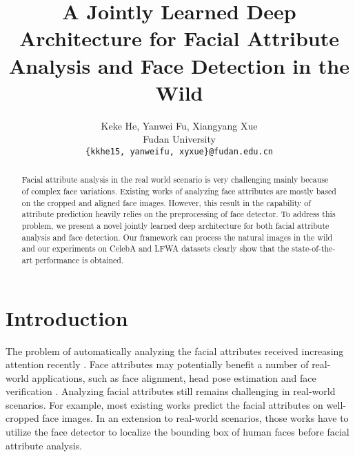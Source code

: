 \documentclass[10pt,twocolumn,letterpaper]{article}
\begin{document}
\title{A Jointly Learned Deep Architecture for Facial Attribute Analysis and Face Detection in the Wild}

\author{Keke He, Yanwei Fu, Xiangyang Xue\\
Fudan University \\
{\tt\small \{kkhe15, yanweifu, xyxue\}@fudan.edu.cn}
}

\maketitle



\begin{abstract}
Facial attribute analysis in the real world scenario is very challenging mainly because of complex face variations. Existing works of analyzing face attributes are mostly based on the cropped and aligned face images. However, this result in the capability of attribute prediction heavily relies on the preprocessing of face detector. To address this problem, we present a novel jointly learned deep architecture for both facial attribute analysis and face detection. Our framework can process the natural images in the wild and our experiments on CelebA and LFWA datasets clearly show that the state-of-the-art performance is obtained. 
\end{abstract}


\section{Introduction}
The problem of automatically analyzing the facial attributes received increasing attention recently
\cite{rudd2016moon,liu2015deep,off_shelf_face}.
Face attributes may potentially benefit a number of real-world applications,
such as face alignment\cite{ren2014face,sagonas2013300,zhang2014facial,zhou2013extensive},
head pose estimation \cite{zhu2012face,yang2015face} and face verification
\cite{taigman2014deepface,sun2014deep}. Analyzing facial attributes
still remains challenging in real-world scenarios. For example, most
existing works \cite{rudd2016moon} predict the facial attributes
on well-cropped face images. In an extension to real-world scenarios,
those works have to utilize the face detector to localize the bounding
box of human faces before facial attribute analysis. 
\end{document}
